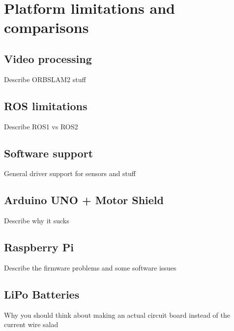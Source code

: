 \chapter{Platform limitations and comparisons}\label{cha:PlatformLimits}


\section{Video processing}
Describe ORBSLAM2 stuff

\section{ROS limitations}
Describe ROS1 vs ROS2

\section{Software support}
General driver support for sensors and stuff

\section{Arduino UNO + Motor Shield}
Describe why it sucks

\section{Raspberry Pi}
Describe the firmware problems and some software issues

\section{LiPo Batteries}
Why you should think about making an actual circuit board instead of the current wire salad
